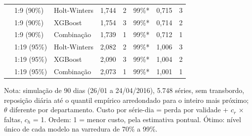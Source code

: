 \begin{table}[htbp]
\begin{tabular}{lllrrrrr}
 & 1:9 (90\%) & Holt-Winters & 1,744 & 2 & 99\%* & 0,715 & 3 \\
 & 1:9 (90\%) & XGBoost & 1,754 & 3 & 99\%* & 0,714 & 2 \\
 & 1:9 (90\%) & Combinação & 1,739 & 1 & 99\%* & 0,712 & 1 \\
 & 1:19 (95\%) & Holt-Winters & 2,082 & 2 & 99\%* & 1,006 & 3 \\
 & 1:19 (95\%) & XGBoost & 2,090 & 3 & 99\%* & 1,004 & 2 \\
 & 1:19 (95\%) & Combinação & 2,073 & 1 & 99\%* & 1,001 & 1 \\
\bottomrule
\end{tabular}
\par\smallskip
{\footnotesize Nota: simulação de 90 dias (26/01 a 24/04/2016), 5.748 séries, sem transbordo, reposição diária até o quantil empírico arredondado para o inteiro mais próximo; $\theta$ diferente por departamento. Custo por série-dia = perda por validade + $c_r$ × faltas, $c_h$ = 1. Ordem: 1 = menor custo, pela estimativa pontual. Ótimo: nível único de cada modelo na varredura de 70\% a 99\%.}
\end{table}
